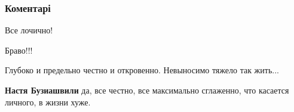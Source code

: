  
 
 
 
 
\subsubsection{Коментарі}

\begin{itemize}
 
Все лочично!

 
Браво!!!

 
Глубоко и предельно честно и откровенно. Невыносимо тяжело так жить...

\begin{itemize}
 
\textbf{Настя Бузиашвили} да, все честно, все максимально сглаженно, что касается личного, в жизни хуже.
\end{itemize}

 


\end{itemize}
